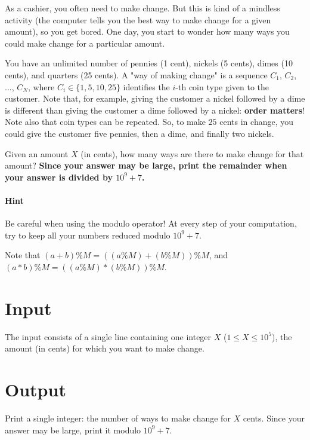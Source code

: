 
As a cashier, you often need to make change. But this is kind of a mindless
activity (the computer tells you the best way to make change for a given
amount), so you get bored. One day, you start to wonder how many ways you could
make change for a particular amount.
 
You have an unlimited number of pennies (1 cent), nickels (5 cents), dimes (10
cents), and quarters (25 cents).  A "way of making change" is a sequence $C_1$, $C_2$, ..., $C_N$, where $C_i\in \{1,5,10,25\}$ identifies
the $i$-th coin type given to the customer. Note that, for example, giving the
customer a nickel followed by a dime is different than giving the customer a
dime followed by a nickel: \textbf{order matters}! Note also that coin types can be
repeated. So, to make $25$ cents in change, you could give the customer five
pennies, then a dime, and finally two nickels.
 
Given an amount $X$ (in cents), how many ways
are there to make change for that amount? \textbf{Since your answer may be large, print
the remainder when your answer is divided by $10^9 + 7$.}
 
\paragraph{Hint}
Be careful when using the modulo operator! At every step of your computation,
try to keep all your numbers reduced modulo $10^9 + 7$. 
 
Note that $ (a + b) \% M =((a \% M) + (b \% M)) \% M $, and $ (a * b) \% M = ((a \% M) * (b \% M)) \% M $.
 
\section*{Input}
The input consists of a single line containing one integer $X$ ($1 \leq X \leq 10^5$), the amount (in cents) for which you want to make change.
 
\section*{Output}
Print a single integer: the number of ways to make change for $X$ cents. Since your answer may be large, print it modulo $10^9 + 7$.
